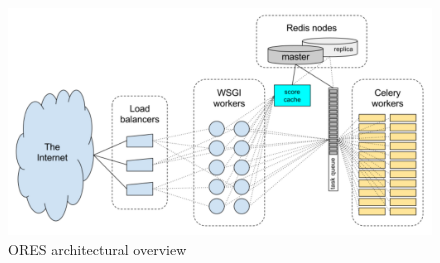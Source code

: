 \begin{figure}[h]
  \centering
  \includegraphics[width=.95\textwidth]{figures/ORES_architecture}
  \caption{ORES architectural overview}
  \label{fig:ores_architecture}
\end{figure}
